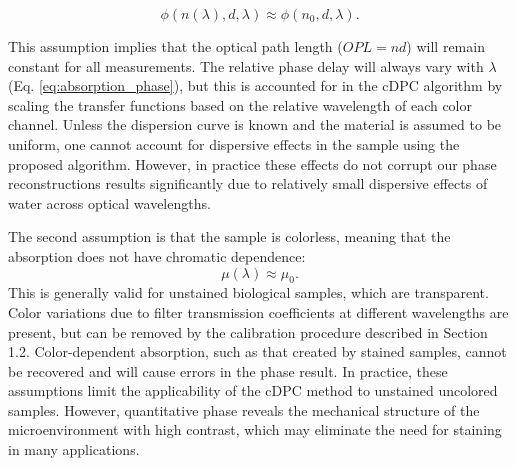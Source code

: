 \begin{equation} \label{Eq:nonDispersive}
\phi(n(\lambda),d,\lambda) \approx \phi(n_0,d,\lambda).
\end{equation}

\noindent This assumption implies that the optical path length ($OPL = nd$) will remain constant for all measurements. The relative phase delay will always vary with $\lambda$ (Eq. \ref{eq:absorption_phase}), but this is accounted for in the cDPC algorithm by scaling the transfer functions based on the relative wavelength of each color channel. Unless the dispersion curve is known and the material is assumed to be uniform, one cannot account for dispersive effects in the sample using the proposed algorithm. However, in practice these effects do not corrupt our phase reconstructions results significantly due to relatively small dispersive effects of water across optical wavelengths.

The second assumption is that the sample is colorless, meaning that the absorption does not have chromatic dependence:
\begin{equation} \label{outEq:monochrome}
\mu(\lambda) \approx \mu_0.
\end{equation}
\noindent This is generally valid for unstained biological samples, which are transparent. Color variations due to filter transmission coefficients at different wavelengths are present, but can be removed by the calibration procedure described in Section 1.2. Color-dependent absorption, such as that created by stained samples, cannot be recovered and will cause errors in the phase result. In practice, these assumptions limit the applicability of the cDPC method to unstained uncolored samples. However, quantitative phase reveals the mechanical structure of the microenvironment with high contrast, which may eliminate the need for staining in many applications.
